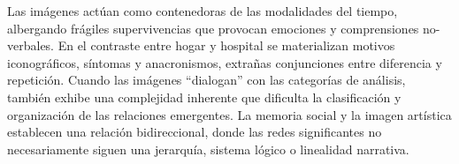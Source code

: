 Las imágenes actúan como contenedoras de las modalidades del tiempo, albergando frágiles supervivencias que provocan emociones y comprensiones no-verbales. En el contraste entre hogar y hospital se materializan motivos iconográficos, síntomas y anacronismos, extrañas conjunciones entre diferencia y repetición. Cuando las imágenes ``dialogan'' con las categorías de análisis, también exhibe una complejidad inherente que dificulta la clasificación y organización de las relaciones emergentes. La memoria social y la imagen artística establecen una relación bidireccional, donde las redes significantes no necesariamente siguen una jerarquía, sistema lógico o linealidad narrativa.